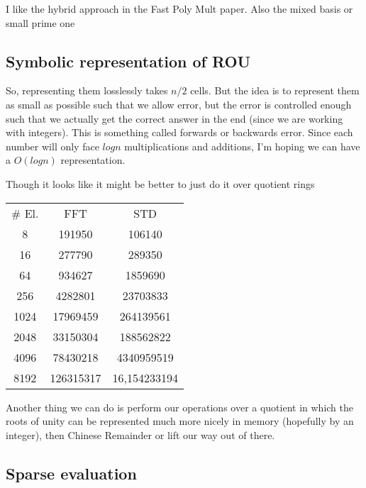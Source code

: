 I like the hybrid approach in the Fast Poly Mult paper. Also the mixed basis or small prime one

\subsection{Symbolic representation of ROU}

So, representing them losslessly takes $n/2$ cells. But the idea is to represent them as small as possible such that we allow error, but the error is controlled enough such that we actually get the correct answer in the end (since we are working with integers). This is something called forwards or backwards error. Since each number will only face $log n$ multiplications and additions, I'm hoping we can have a $O(log n)$ representation.

Though it looks like it might be better to just do it over quotient rings

\begin{center}
    \begin{tabular}{|c| c c|}
        \# El. & FFT & STD\\
        8      & 191950 & 106140 \\
        16     & 277790 & 289350 \\
        64     & 934627 & 1859690 \\
        256    & 4282801 & 23703833 \\
        1024   & 17969459 & 264139561 \\
        2048   & 33150304 & 188562822 \\
        4096   & 78430218 & 4340959519 \\
        8192   & 126315317 & 16,154233194 \\
    \end{tabular}
\end{center}


Another thing we can do is perform our operations over a quotient in which the roots of unity can be represented much more nicely in memory (hopefully by an integer), then Chinese Remainder or lift our way out of there.

\subsection{Sparse evaluation}

